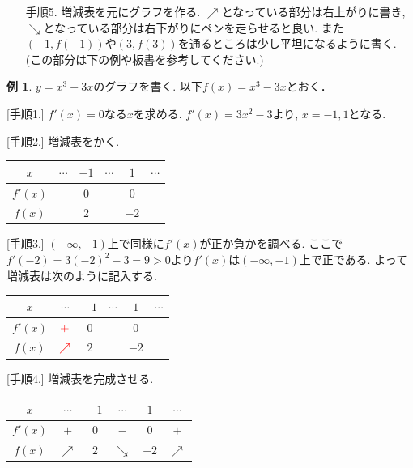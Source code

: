 \documentclass[dvipdfmx,a4paper,11pt]{article}
\theoremstyle{definition}
\newtheorem{exa}[thm]{例}
\newcommand{\xr}[1]{\textcolor{red}{#1}}
\begin{document}
\begin{tcolorbox}[
    colback = white,
    colframe = green!35!black,
    fonttitle = \bfseries,
    breakable = true]
\begin{itemize}
\item[手順5.] 増減表を元にグラフを作る. $\nearrow$となっている部分は右上がりに書き, $\searrow$となっている部分は右下がりにペンを走らせると良い. また$(-1, f(-1))$や$(3, f(3))$を通るところは少し平坦になるように書く. (この部分は下の例や板書を参考してください.)

\end{itemize}
\end{tcolorbox}

\begin{exa}
$y=x^3 - 3x$のグラフを書く. 以下$f(x) = x^3 - 3x$とおく．

[手順1.] $f'(x)=0$なる$x$を求める.
 $f'(x)=3x^2-3$より, $x =-1,1$となる. 
 
 [手順2.] 増減表をかく.
\begin{tabular}{|c||ccccc|}
\hline
$x$ & $\cdots$ & $-1$ & $\cdots$ & $1$ & $\cdots$ \\
\hline
$f'(x)$ &  & $0$ &  & $0$ &  \\
\hline
$f(x)$  &  & $2$ &  & $-2$&  \\
\hline
\end{tabular}

[手順3.] $(-\infty, -1)$上で同様に$f'(x)$が正か負かを調べる.
ここで$f'(-2)=3(-2)^2 - 3 = 9>0$より$f'(x)$は$(-\infty, -1)$上で正である. よって増減表は次のように記入する. 

\begin{center}
\begin{tabular}{|c||ccccc|}
\hline
$x$ & $\cdots$ & $-1$ & $\cdots$ & $1$ & $\cdots$ \\
\hline
$f'(x)$ & $\xr{+}$   & $0$ &  & $0$ &  \\
\hline
$f(x)$  &  $\xr{\nearrow}$  & $2$ &  & $-2$&  \\
\hline
\end{tabular}
\end{center}

[手順4.] 増減表を完成させる.

\begin{center}
\begin{tabular}{|c||ccccc|}
\hline
$x$ & $\cdots$ & $-1$ & $\cdots$ & $1$ & $\cdots$ \\
\hline
$f'(x)$ & $+$ & $0$ & $-$ & $0$ & $+$ \\
\hline
$f(x)$ & $\nearrow$ &$2$ & $\searrow$ & $-2$& $\nearrow$ \\
\hline
\end{tabular}
\end{center}



\end{exa}
\end{document}
